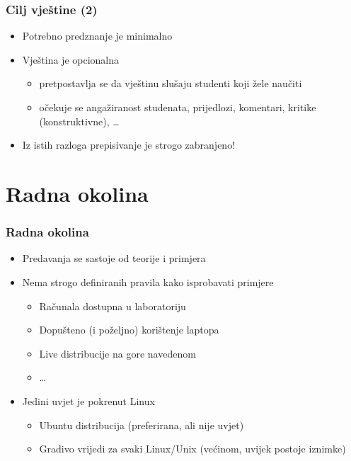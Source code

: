 \documentclass{beamer}
\begin{document}
\begin{frame}[t]
\frametitle{Cilj vještine (2)}
\begin{itemize}
	\item Potrebno predznanje je minimalno
	\item Vještina je opcionalna
	\begin{itemize}
		\item pretpostavlja se da vještinu slušaju studenti koji žele naučiti
		\item očekuje se angažiranost studenata, prijedlozi, komentari, kritike (konstruktivne), \ldots
	\end{itemize}
	\item Iz istih razloga prepisivanje je strogo zabranjeno!
\end{itemize}
\end{frame}


\section{Radna okolina}
\begin{frame}[t]
\frametitle{Radna okolina}
\begin{itemize}
	\item Predavanja se sastoje od teorije i primjera
	\item Nema strogo definiranih pravila kako isprobavati primjere
	\begin{itemize}
		\item Računala dostupna u laboratoriju 
		\item Dopušteno (i poželjno) korištenje laptopa
		\item Live distribucije na gore navedenom
		\item \ldots
	\end{itemize} 
	\item Jedini uvjet je pokrenut Linux
	\begin{itemize}
		\item Ubuntu distribucija (preferirana, ali nije uvjet)
		\item Gradivo vrijedi za svaki Linux/Unix (većinom, uvijek postoje iznimke)
	\end{itemize}
\end{itemize}
\end{frame}
\end{document}
